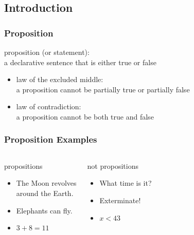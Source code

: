 \documentclass[dvipsnames]{beamer}
\begin{document}
\subsection{Introduction}

\begin{frame}
  \frametitle{Proposition}

  \begin{definition}
    \alert{proposition} (or \alert{statement}):\\
      a declarative sentence that is either true or false
  \end{definition}

  \pause
  \begin{itemize}
    \item \alert{law of the excluded middle}:\\
      a proposition cannot be partially true or partially false
  \end{itemize}

  \begin{itemize}
    \item \alert{law of contradiction}:\\
      a proposition cannot be both true and false
  \end{itemize}
\end{frame}

\begin{frame}
  \frametitle{Proposition Examples}

  \begin{columns}[t]
    \begin{exampleblock}{propositions}
      \begin{itemize}
        \item The Moon revolves\\
          around the Earth.
        \item Elephants can fly.
        \item $3+8=11$
      \end{itemize}
    \end{exampleblock}

    \pause
    \begin{exampleblock}{not propositions}
      \begin{itemize}
        \item What time is it?
        \item Exterminate!
        \item $x<43$
      \end{itemize}
    \end{exampleblock}
  \end{columns}
\end{frame}
\end{document}
